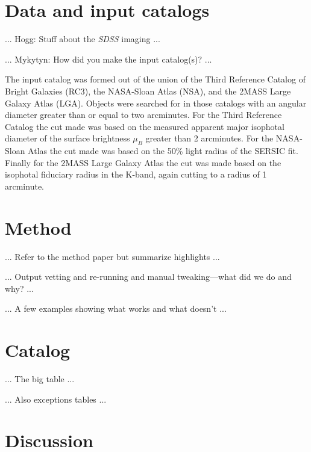 \documentclass[12pt,preprint,dvipdf]{aastex}
\newcommand{\project}[1]{\textsl{#1}}
\begin{document}
\section{Data and input catalogs}

... Hogg: Stuff about the \project{SDSS} imaging ...

... Mykytyn: How did you make the input catalog(s)? ...

The input catalog was formed out of the union of the Third Reference Catalog of Bright Galaxies (RC3), the NASA-Sloan Atlas (NSA), and the 2MASS Large Galaxy Atlas (LGA). Objects were searched for in those catalogs with an angular diameter greater than or equal to two arcminutes. For the Third Reference Catalog the cut made was based on the measured apparent major isophotal diameter of the surface brightness $\mu_{B}$ greater than 2 arcminutes. For the NASA-Sloan Atlas the cut made was based on the 50\% light radius of the SERSIC fit. Finally for the 2MASS Large Galaxy Atlas the cut was made based on the isophotal fiduciary radius in the K-band, again cutting to a radius of 1 arcminute.

\section{Method}

... Refer to the method paper but summarize highlights ...

... Output vetting and re-running and manual tweaking---what did we do and why? ...

... A few examples showing what works and what doesn't ...

\section{Catalog}

... The big table ...

... Also exceptions tables ...

\section{Discussion}
\end{document}
